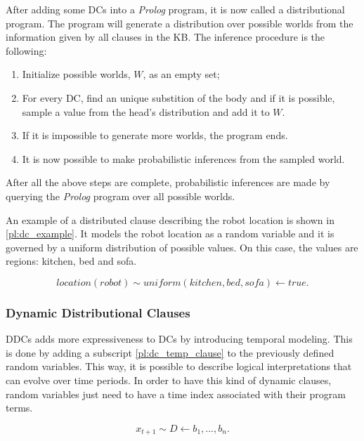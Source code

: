 After adding some \glspl{DC} into a \textit{Prolog} program, it is now called
a distributional program. The program will generate a distribution over possible
worlds from the information given by all clauses in the \gls{KB}. The inference
procedure is the following:
\begin{enumerate}
  \item Initialize possible worlds, $W$, as an empty set;
  \item For every \gls{DC}, find an unique substition of the body and if it is
  possible, sample a value from the head's distribution and add it to $W$.
  \item If it is impossible to generate more worlds, the program ends.
  \item It is now possible to make probabilistic inferences from the sampled
  world.
\end{enumerate}

After all the above steps are complete, probabilistic inferences are made by
querying the \textit{Prolog} program over all possible worlds.

An example of a distributed clause describing the robot location is shown in
\ref{pl:dc_example}. It models the robot location as a random variable and it is
governed by a uniform distribution of possible values. On this case,
the values are regions: kitchen, bed and sofa.

\begin{equation}
    location(robot) \sim uniform(kitchen, bed, sofa) \leftarrow true.
    \label{pl:dc_example}
\end{equation}

\subsubsection{Dynamic Distributional Clauses}

\glspl{DDC} \cite{nitti2016probabilistic} adds more expressiveness to \glspl{DC}
by introducing temporal
modeling. This is done by adding a subscript \ref{pl:dc_temp_clause} to the
previously defined random variables. This way, it is possible to describe
logical interpretations that can evolve over time periods. In order to have this
kind of dynamic clauses, random variables just need to have a time index
associated with their program terms.

\begin{equation}
    x_{t+1} \sim D \leftarrow b_1, ..., b_n.
    \label{pl:dc_temp_clause}
\end{equation}

